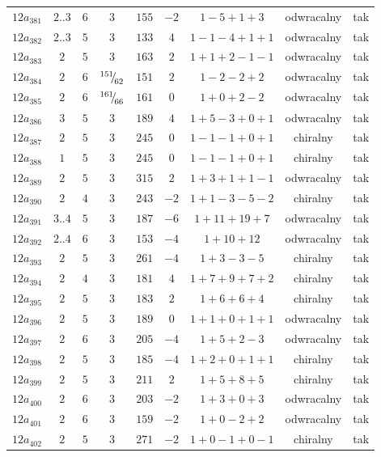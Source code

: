 \begin{longtable}{ccccccccc}
$12a_{381}$ & $2..3$ & $6$ & $3$ & $155$ & $-2$ & $1-5+1+3$ & odwracalny & tak \\
$12a_{382}$ & $2..3$ & $5$ & $3$ & $133$ & $4$ & $1-1-4+1+1$ & odwracalny & tak \\
$12a_{383}$ & $2$ & $5$ & $3$ & $163$ & $2$ & $1+1+2-1-1$ & odwracalny & tak \\
$12a_{384}$ & $2$ & $6$ & ${}^{151}{\mskip -5mu/\mskip -3mu}_{62}$ & $151$ & $2$ & $1-2-2+2$ & odwracalny & tak \\
$12a_{385}$ & $2$ & $6$ & ${}^{161}{\mskip -5mu/\mskip -3mu}_{66}$ & $161$ & $0$ & $1+0+2-2$ & odwracalny & tak \\
$12a_{386}$ & $3$ & $5$ & $3$ & $189$ & $4$ & $1+5-3+0+1$ & odwracalny & tak \\
$12a_{387}$ & $2$ & $5$ & $3$ & $245$ & $0$ & $1-1-1+0+1$ & chiralny & tak \\
$12a_{388}$ & $1$ & $5$ & $3$ & $245$ & $0$ & $1-1-1+0+1$ & chiralny & tak \\
$12a_{389}$ & $2$ & $5$ & $3$ & $315$ & $2$ & $1+3+1+1-1$ & odwracalny & tak \\
$12a_{390}$ & $2$ & $4$ & $3$ & $243$ & $-2$ & $1+1-3-5-2$ & chiralny & tak \\
$12a_{391}$ & $3..4$ & $5$ & $3$ & $187$ & $-6$ & $1+11+19+7$ & odwracalny & tak \\
$12a_{392}$ & $2..4$ & $6$ & $3$ & $153$ & $-4$ & $1+10+12$ & odwracalny & tak \\
$12a_{393}$ & $2$ & $5$ & $3$ & $261$ & $-4$ & $1+3-3-5$ & chiralny & tak \\
$12a_{394}$ & $2$ & $4$ & $3$ & $181$ & $4$ & $1+7+9+7+2$ & chiralny & tak \\
$12a_{395}$ & $2$ & $5$ & $3$ & $183$ & $2$ & $1+6+6+4$ & chiralny & tak \\
$12a_{396}$ & $2$ & $5$ & $3$ & $189$ & $0$ & $1+1+0+1+1$ & odwracalny & tak \\
$12a_{397}$ & $2$ & $6$ & $3$ & $205$ & $-4$ & $1+5+2-3$ & odwracalny & tak \\
$12a_{398}$ & $2$ & $5$ & $3$ & $185$ & $-4$ & $1+2+0+1+1$ & chiralny & tak \\
$12a_{399}$ & $2$ & $5$ & $3$ & $211$ & $2$ & $1+5+8+5$ & chiralny & tak \\
$12a_{400}$ & $2$ & $6$ & $3$ & $203$ & $-2$ & $1+3+0+3$ & odwracalny & tak \\
$12a_{401}$ & $2$ & $6$ & $3$ & $159$ & $-2$ & $1+0-2+2$ & odwracalny & tak \\
$12a_{402}$ & $2$ & $5$ & $3$ & $271$ & $-2$ & $1+0-1+0-1$ & chiralny & tak \\

\end{longtable}
